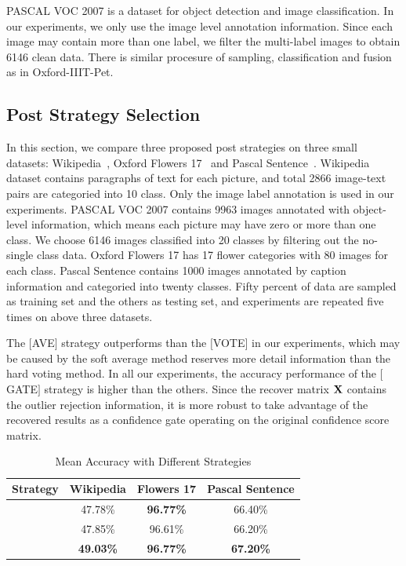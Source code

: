 \documentclass[letterpaper]{article}
\def\bX{{\bf X}}
\def\bX{{\bf X}}
\begin{document}
PASCAL VOC 2007 is a dataset for object detection and image classification.
In our experiments, we only use the image level annotation information.
Since each image may contain more than one label, we filter the multi-label images to obtain 6146 clean data.
There is similar procesure of sampling, classification and fusion as in Oxford-IIIT-Pet.



\subsection{Post Strategy Selection}

In this section, we compare three proposed post strategies on three small datasets: Wikipedia~\cite{rasiwasia2010new}, Oxford Flowers 17~\cite{nilsback2006visual} and Pascal Sentence~\cite{Li2006One}.
Wikipedia dataset contains paragraphs of text for each picture, and total 2866 image-text pairs are categoried into 10 class.
Only the image label annotation is used in our experiments.
PASCAL VOC 2007 contains 9963 images annotated with object-level information, which means each picture may have zero or more than one class.
We choose 6146 images classified into 20 classes by filtering out the no-single class data.
Oxford Flowers 17 has 17 flower categories with 80 images for each class.
Pascal Sentence contains 1000 images annotated by caption information and categoried into twenty classes.
Fifty percent of data are sampled as training set and the others as testing set, and experiments are repeated five times on above three datasets.

The $[$AVE$]$ strategy outperforms than the $[$VOTE$]$ in our experiments, which may be caused by the soft average method reserves more detail information than the hard voting method.
In all our experiments, the accuracy performance of the $[$GATE$]$ strategy is higher than the others.
Since the recover matrix $\bX$ contains the outlier rejection information,
it is more robust to take advantage of the recovered results as a confidence gate operating on the original confidence score matrix.

\begin{table}[ht]
\centering
\caption{Mean Accuracy with Different Strategies}
\begin{tabular}{c|c|c|c}
\hline
Strategy            & Wikipedia         & Flowers 17          & Pascal Sentence     \\\hline
[AVE]               & 47.78\%           & \textbf{96.77\%}    & 66.40\%             \\\hline
[VOTE]              & 47.85\%           & 96.61\%             & 66.20\%             \\\hline
[GATE]              & \textbf{49.03\%}  & \textbf{96.77\%}    & \textbf{67.20\%}    \\
\hline
\end{tabular}
\label{table:strategy}
\end{table}
\end{document}
